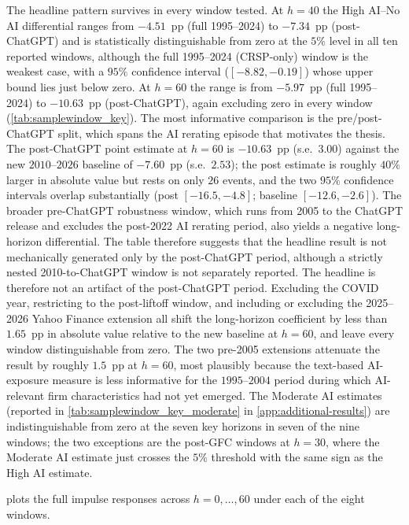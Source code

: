 The headline pattern survives in every window tested. At $h = 40$
the High AI--No AI differential ranges from $-4.51$~pp (full
1995--2024) to $-7.34$~pp (post-ChatGPT) and is statistically
distinguishable from zero at the $5\%$ level in all ten reported
windows, although the full 1995--2024 (CRSP-only) window is the
weakest case, with a $95\%$ confidence interval ($[-8.82, -0.19]$)
whose upper bound lies just below zero. At
$h = 60$ the range is from $-5.97$~pp (full 1995--2024) to
$-10.63$~pp (post-ChatGPT), again excluding zero in every window
(\cref{tab:samplewindow_key}). The most informative comparison is
the pre/post-ChatGPT split, which spans the AI rerating episode
that motivates the thesis. The post-ChatGPT point estimate at
$h = 60$ is $-10.63$~pp (s.e.~$3.00$) against the new $2010$--$2026$
baseline of $-7.60$~pp (s.e.~$2.53$); the post estimate is roughly
$40\%$ larger in absolute value but rests on only $26$ events, and
the two $95\%$ confidence intervals overlap substantially (post
$[-16.5, -4.8]$; baseline $[-12.6, -2.6]$). The broader pre-ChatGPT robustness window, which runs from 2005 to
the ChatGPT release and excludes the post-2022 AI rerating period,
also yields a negative long-horizon differential. The table
therefore suggests that the headline result is not mechanically
generated only by the post-ChatGPT period, although a strictly
nested 2010-to-ChatGPT window is not separately reported.
The headline is therefore not an artifact of the post-ChatGPT
period. Excluding the COVID year, restricting to
the post-liftoff window, and including or excluding the
2025--2026 Yahoo Finance extension all shift the long-horizon
coefficient by less than $1.65$~pp in absolute value relative to
the new baseline at $h = 60$, and leave every window
distinguishable from zero. The two pre-2005 extensions
attenuate the result by roughly $1.5$~pp at $h = 60$, most plausibly
because the text-based AI-exposure measure is less informative for
the $1995$--$2004$ period during which AI-relevant firm
characteristics had not yet emerged. The Moderate AI estimates
(reported in \cref{tab:samplewindow_key_moderate} in
\cref{app:additional-results}) are indistinguishable from zero at the
seven key horizons in seven of the nine windows; the two exceptions
are the post-GFC windows at $h = 30$, where the Moderate AI estimate
just crosses the $5\%$ threshold with the same sign as the High AI
estimate.

 plots the full impulse responses across
$h = 0,\ldots,60$ under each of the eight windows.

